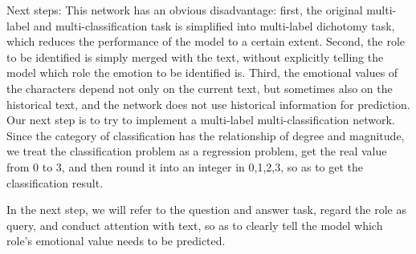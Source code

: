 \documentclass[12pt,twocolumn,letterpaper]{article}
\begin{document}
Next steps:  
This network has an obvious disadvantage: first, the original multi-label and multi-classification task is simplified into multi-label dichotomy task, which reduces the performance of the model to a certain extent.  Second, the role to be identified is simply merged with the text, without explicitly telling the model which role the emotion to be identified is.  Third, the emotional values of the characters depend not only on the current text, but sometimes also on the historical text, and the network does not use historical information for prediction.  
Our next step is to try to implement a multi-label multi-classification network.  Since the category of classification has the relationship of degree and magnitude, we treat the classification problem as a regression problem, get the real value from 0 to 3, and then round it into an integer in {0,1,2,3}, so as to get the classification result.  
 
In the next step, we will refer to the question and answer task, regard the role as query, and conduct attention with text, so as to clearly tell the model which role's emotional value needs to be predicted.  





   \makeatletter
    \renewcommand\@biblabel[1]{}
    \renewenvironment{thebibliography}[1]
    {\section*{\refname}%
    \@mkboth{\MakeUppercase\refname}{\MakeUppercase\refname}%
    \list{\@biblabel{\@arabic\c@enumiv}}%
    {\settowidth\labelwidth{\@biblabel{#1}}%
    \leftmargin\labelwidth
    \advance\leftmargin\labelsep
    \advance\leftmargin by 2em%
    \itemindent -2em%
    \@openbib@code
    \usecounter{enumiv}%
    \let\p@enumiv\@empty
    \renewcommand\theenumiv{\@arabic\c@enumiv}}%
    \sloppy
    \clubpenalty4000
    \@clubpenalty \clubpenalty
    \widowpenalty4000%
    \sfcode`\.\@m}
    {\def\@noitemerr
    {\@latex@warning{Empty `thebibliography' environment}}%
    \endlist}
    \makeatother
\end{document}
